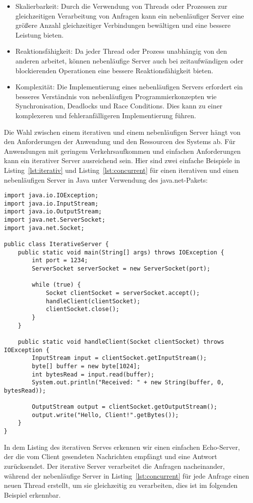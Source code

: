 \begin{itemize}
\item Skalierbarkeit: Durch die Verwendung von Threads oder Prozessen zur gleichzeitigen Verarbeitung von Anfragen kann ein nebenläufiger Server eine größere Anzahl gleichzeitiger Verbindungen bewältigen und eine bessere Leistung bieten.
\item Reaktionsfähigkeit: Da jeder Thread oder Prozess unabhängig von den anderen arbeitet, können nebenläufige Server auch bei zeitaufwändigen oder blockierenden Operationen eine bessere Reaktionsfähigkeit bieten.
\item Komplexität: Die Implementierung eines nebenläufigen Servers erfordert ein besseres Verständnis von nebenläufigen Programmierkonzepten wie Synchronisation, Deadlocks und Race Conditions. Dies kann zu einer komplexeren und fehleranfälligeren Implementierung führen.
\end{itemize}
Die Wahl zwischen einem iterativen und einem nebenläufigen Server hängt von den Anforderungen der Anwendung und den Ressourcen des Systems ab. Für Anwendungen mit geringem Verkehrsaufkommen und einfachen Anforderungen kann ein iterativer Server ausreichend sein. Hier sind zwei einfache Beispiele in Listing~\ref{lst:iterativ} und Listing~\ref{lst:concurrent} für einen iterativen und einen nebenläufigen Server in Java unter Verwendung des java.net-Pakets:
\begin{lstlisting}[caption={Iterativer Server},captionpos=b,label={lst:iterativ}]
import java.io.IOException;
import java.io.InputStream;
import java.io.OutputStream;
import java.net.ServerSocket;
import java.net.Socket;

public class IterativeServer {
    public static void main(String[] args) throws IOException {
        int port = 1234;
        ServerSocket serverSocket = new ServerSocket(port);

        while (true) {
            Socket clientSocket = serverSocket.accept();
            handleClient(clientSocket);
            clientSocket.close();
        }
    }

    public static void handleClient(Socket clientSocket) throws IOException {
        InputStream input = clientSocket.getInputStream();
        byte[] buffer = new byte[1024];
        int bytesRead = input.read(buffer);
        System.out.println("Received: " + new String(buffer, 0, bytesRead));

        OutputStream output = clientSocket.getOutputStream();
        output.write("Hello, Client!".getBytes());
    }
}
\end{lstlisting}
In dem Listing des iterativen Serves erkennen wir einen einfachen Echo-Server, der die vom Client gesendeten Nachrichten empfängt und eine Antwort zurücksendet. Der iterative Server verarbeitet die Anfragen nacheinander, während der nebenläufige Server in Listing~\ref{lst:concurrent} für jede Anfrage einen neuen Thread erstellt, um sie gleichzeitig zu verarbeiten, dies ist im folgenden Beispiel erkennbar.

